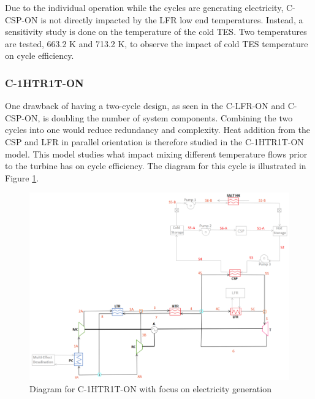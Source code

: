 \begin{paracol}{2}
\linenumbers
\switchcolumn

 Due to the individual operation while the cycles are generating electricity, C-CSP-ON is not directly impacted by the LFR low end temperatures. Instead, a sensitivity study is done on the temperature of the cold TES. Two temperatures are tested, 663.2 K and 713.2 K, to observe the impact of cold TES temperature on cycle efficiency. 


\subsubsection{C-1HTR1T-ON} %

One drawback of having a two-cycle design, as seen in the C-LFR-ON and C-CSP-ON, is doubling the number of system components. Combining the two cycles into one would reduce redundancy and complexity. Heat addition from the CSP and LFR in parallel orientation is therefore studied in the C-1HTR1T-ON model. This model studies what impact mixing different temperature flows prior to the turbine has on cycle efficiency. The diagram for this cycle is illustrated in Figure \ref{c-1htr1t-on}.

\end{paracol}
\begin{figure}[H] 
    \widefigure
    \includegraphics[width=\linewidth]{Definitions/c-1htr1t-on.pdf}
    \caption{Diagram for C-1HTR1T-ON with focus on electricity generation\label{c-1htr1t-on}}
\end{figure}
